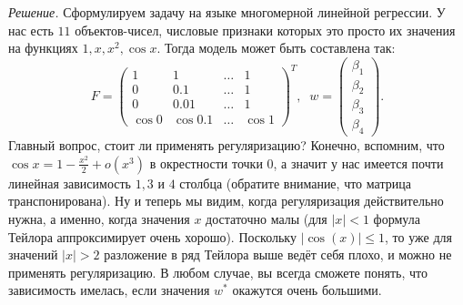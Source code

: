 \noindent\textit{Решение.} Сформулируем задачу на языке многомерной линейной регрессии. У нас есть $11$ объектов-чисел, числовые признаки которых это просто их значения на функциях $1, x, x^2, \cos x$. Тогда модель может быть составлена так:
$$F = \begin{pmatrix}
    1 & 1 & \dots & 1 \\
    0 & 0.1 & \dots & 1 \\
    0 & 0.01 & \dots & 1 \\
    \cos 0 & \cos 0.1 & \dots & \cos 1
\end{pmatrix}^T, \;\; w = \begin{pmatrix}
    \beta_1 \\
    \beta_2 \\
    \beta_3 \\
    \beta_4
\end{pmatrix}.$$
Главный вопрос, стоит ли применять регуляризацию? Конечно, вспомним, что $\cos x = 1 - \frac{x^2}{2} + o(x^3)$ в окрестности точки $0$, а значит у нас имеется почти линейная зависимость $1, 3$ и $4$ столбца (обратите внимание, что матрица транспонирована). Ну и теперь мы видим, когда регуляризация действительно нужна, а именно, когда значения $x$ достаточно малы (для $|x| < 1$ формула Тейлора аппроксимирует очень хорошо). Поскольку $|\cos(x)| \leqslant 1$, то уже для значений $|x| > 2$ разложение в ряд Тейлора выше ведёт себя плохо, и можно не применять регуляризацию. В любом случае, вы всегда сможете понять, что зависимость имелась, если значения $w^*$ окажутся очень большими.
